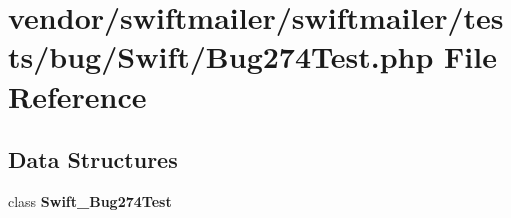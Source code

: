 \section{vendor/swiftmailer/swiftmailer/tests/bug/\+Swift/\+Bug274\+Test.php File Reference}
\label{_bug274_test_8php}
\subsection*{Data Structures}
\begin{DoxyCompactItemize}
\item 
class {\bf Swift\+\_\+\+Bug274\+Test}
\end{DoxyCompactItemize}
